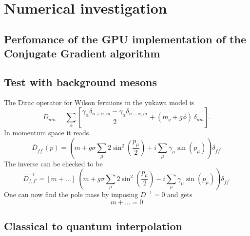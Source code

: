\chapter{Numerical investigation}

\section{Perfomance of the GPU implementation of the Conjugate Gradient algorithm}

\section{Test with background mesons}

The Dirac operator for Wilson fermions in the yukawa model is
\begin{equation*}
D_{n m}=\sum_\alpha\left[\frac{\gamma_\alpha \delta_{n+\alpha, m} - \gamma_\alpha \delta_{n-\alpha, m}}{2} + (m_q + g \phi) \, \delta_{n m}\right] .
\end{equation*}
In momentum space it reads
\begin{equation*}
\bar{D}_{f f^{\prime}}(p)=\left(m+ g \sigma \sum_\mu 2 \sin ^2\left(\frac{p_\mu}{2}\right)+i \sum_\mu \gamma_\mu \sin \left(p_\mu\right)\right) \delta_{f f^{\prime}}
\end{equation*}
The inverse can be checked to be 
\begin{equation*}
    \bar D_{f,f'} ^{-1} = \left[m + \dots\right] \ \left(m+ g \sigma \sum_\mu 2 \sin ^2\left(\frac{p_\mu}{2}\right) - i \sum_\mu \gamma_\mu \sin \left(p_\mu\right)\right) \delta_{f f^{\prime}}
\end{equation*}
One can now find the pole mass by imposing $D^{-1} = 0$ and gets 
\begin{equation*}
    m + \dots = 0
\end{equation*}

\section{Classical to quantum interpolation}
\label{sec:classical_to_quantum}

